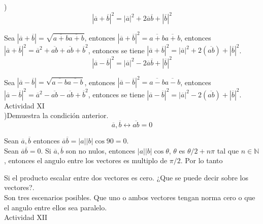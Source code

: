 \documentclass[11pt,a4paper]{article}
\begin{document}
\begin{justify}
)\\

$$ |\overline{a}+\overline{b}|^2= |\overline{a}|^2+ 2\overline{a}\overline{b}+|\overline{b}|^2 $$

Sea $|\overline{a}+\overline{b}|=\sqrt{\overline{a+b}\overline{a+b}}$, entonces $|\overline{a}+\overline{b}|^2 = \overline{a+b}\overline{a+b}$, entonces $|\overline{a}+\overline{b}|^2 = \overline{a}^2+\overline{ab}+\overline{ab}+\overline{b}^2$, entonces se tiene $|\overline{a}+\overline{b}|^2 = |\overline{a}|^2+2(\overline{ab})+|\overline{b}|^2$.\\

$$ |\overline{a}-\overline{b}|^2= |\overline{a}|^2- 2\overline{a}\overline{b}+|\overline{b}|^2 $$

Sea $|\overline{a}-\overline{b}|=\sqrt{\overline{a-b}\overline{a-b}}$, entonces $|\overline{a}-\overline{b}|^2 = \overline{a-b}\overline{a-b}$, entonces $|\overline{a}-\overline{b}|^2 = \overline{a}^2-\overline{ab}-\overline{ab}+\overline{b}^2$, entonces se tiene $|\overline{a}-\overline{b}|^2 = |\overline{a}|^2-2(\overline{ab})+|\overline{b}|^2$.\\



\noindent
Actividad XI\\

)Demuestra la condición anterior.\\

$$ \overline{a}, \overline{b} \leftrightarrow \overline{ab} = 0 $$

\noindent
Sean $\overline{a}, \overline{b}$ entonces $\overline{a}\overline{b} = |a||b|\cos 90 = 0$.\\

\noindent
Sean $\overline{a}\overline{b} = 0$. Si $\overline{a},\overline{b}$ son no nulos, entonces $|a||b|\cos \theta$, $\theta$ es $\theta/2 +n\pi$ tal que $n \in \mathbb{N}$, entonces el angulo entre los vectores es multiplo de $\pi/2$. Por lo tanto  

\noindent
Si el producto escalar entre dos vectores es cero. ¿Que se puede decir sobre los vectores?.\\

\noindent
Son tres escenarios posibles. Que uno o ambos vectores tengan norma cero o que el angulo entre ellos sea paralelo.\\

\noindent
Actividad XII\\


\end{justify}
\end{document}
